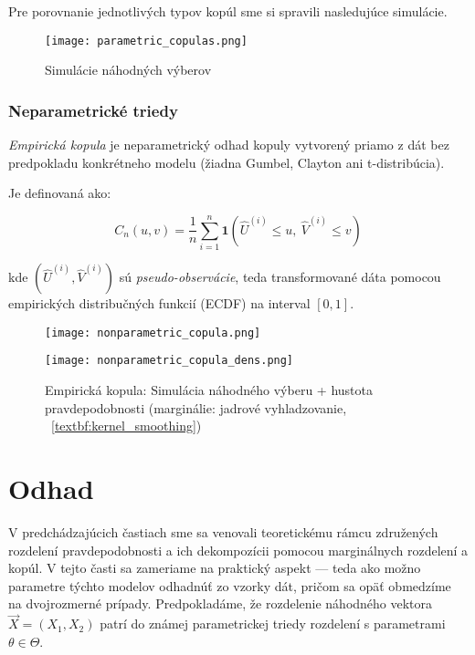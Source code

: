 Pre porovnanie jednotlivých typov kopúl sme si spravili nasledujúce simulácie.

\begin{figure}[H]
    \centering
    \texttt{[image: parametric\_copulas.png]}
    \caption{Simulácie náhodných výberov}
    \label{fig:parametric_copulas}
\end{figure}

\subsubsection{Neparametrické triedy}\label{subsubsec:nonparametric_copula}

\textit{Empirická kopula} je neparametrický odhad kopuly vytvorený priamo z dát bez predpokladu konkrétneho modelu (žiadna Gumbel, Clayton ani t-distribúcia).

Je definovaná ako:

\begin{equation}
C_n(u, v) = \frac{1}{n} \sum_{i=1}^{n} \mathbf{1}\left( \hat{U}^{(i)} \leq u,\ \hat{V}^{(i)} \leq v \right)
\end{equation}

kde $\left(\hat{U}^{(i)}, \hat{V}^{(i)}\right)$ sú \textit{pseudo-observácie}, teda transformované dáta pomocou empirických distribučných funkcií (ECDF) na interval $[0,1]$.

\begin{figure}[H]
    \centering
    \begin{minipage}[t]{0.48\linewidth}
        \centering
        \texttt{[image: nonparametric\_copula.png]}
    \end{minipage}
    \hfill
    \begin{minipage}[t]{0.48\linewidth}
        \centering
        \texttt{[image: nonparametric\_copula\_dens.png]}
    \end{minipage}
    \caption{Empirická kopula: Simulácia náhodného výberu + hustota pravdepodobnosti (marginálie: jadrové vyhladzovanie, ~\ref{textbf:kernel_smoothing})}
    \label{fig:empcopula}
\end{figure}

\section{Odhad}\label{sec:odhad}

V predchádzajúcich častiach sme sa venovali teoretickému rámcu združených rozdelení pravdepodobnosti a ich dekompozícii pomocou marginálnych rozdelení a kopúl. V tejto časti sa zameriame na praktický aspekt — teda ako možno parametre týchto modelov odhadnúť zo vzorky dát, pričom sa opäť obmedzíme na dvojrozmerné prípady. Predpokladáme, že rozdelenie náhodného vektora $\vec{X} = (X_1, X_2)$ patrí do známej parametrickej triedy rozdelení s parametrami $\theta \in \Theta$.

